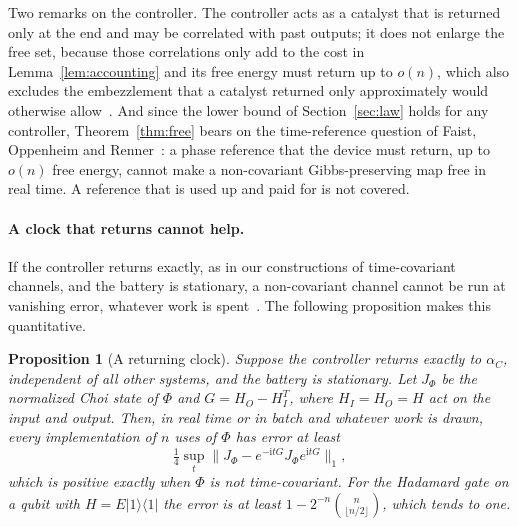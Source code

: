 \documentclass[11pt]{article}
\newtheorem{proposition}[theorem]{Proposition}
\theoremstyle{definition}
\theoremstyle{remark}
\begin{document}
Two remarks on the controller. The controller acts as a catalyst that is returned only at the end and may be correlated with past outputs; it does not enlarge the free set, because those correlations only add to the cost in Lemma~\ref{lem:accounting} and its free energy must return up to $o(n)$, which also excludes the embezzlement that a catalyst returned only approximately would otherwise allow~\cite{FOR15}. And since the lower bound of Section~\ref{sec:law} holds for any controller, Theorem~\ref{thm:free} bears on the time-reference question of Faist, Oppenheim and Renner~\cite{FOR15}: a phase reference that the device must return, up to $o(n)$ free energy, cannot make a non-covariant Gibbs-preserving map free in real time. A reference that is used up and paid for is not covered.

\paragraph{A clock that returns cannot help.} If the controller returns exactly, as in our constructions of time-covariant channels, and the battery is stationary, a non-covariant channel cannot be run at vanishing error, whatever work is spent~\cite{MarvianSpekkens19,LostaglioMuller19}. The following proposition makes this quantitative.

\begin{proposition}[A returning clock]\label{prop:clock}
Suppose the controller returns exactly to $\alpha_C$, independent of all other systems, and the battery is stationary. Let $J_\Phi$ be the normalized Choi state of $\Phi$ and $G=H_O-H_I^T$, where $H_I=H_O=H$ act on the input and output. Then, in real time or in batch and whatever work is drawn, every implementation of $n$ uses of $\Phi$ has error at least
\[
\tfrac14\sup_t\bigl\|J_\Phi-e^{-\mathrm itG}J_\Phi e^{\mathrm itG}\bigr\|_1,
\]
which is positive exactly when $\Phi$ is not time-covariant. For the Hadamard gate on a qubit with $H=E|1\rangle\langle1|$ the error is at least $1-2^{-n}\binom{n}{\lfloor n/2\rfloor}$, which tends to one.
\end{proposition}
\end{document}
